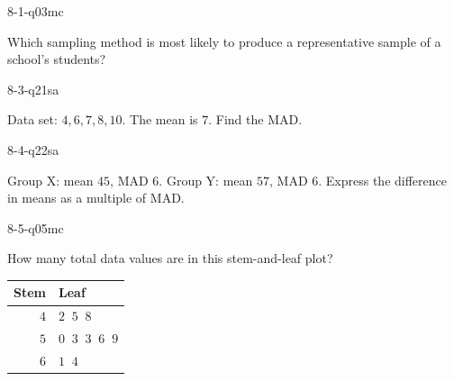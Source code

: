 \begin{practiceQuestion}{8-1-q03}{mc}
\begin{questionText}
Which sampling method is most likely to produce a representative sample of a school's students?
\end{questionText}
\end{practiceQuestion}

\begin{practiceQuestion}{8-3-q21}{sa}
\begin{questionText}
Data set: $4, 6, 7, 8, 10$. The mean is $7$. Find the MAD.
\end{questionText}
\end{practiceQuestion}

\begin{practiceQuestion}{8-4-q22}{sa}
\begin{questionText}
Group X: mean $45$, MAD $6$. Group Y: mean $57$, MAD $6$. Express the difference in means as a multiple of MAD.
\end{questionText}
\end{practiceQuestion}

\begin{practiceQuestion}{8-5-q05}{mc}
\begin{questionText}
How many total data values are in this stem-and-leaf plot?

\begin{center}
\begin{tabular}{r|l}
\textbf{Stem} & \textbf{Leaf} \\
\hline
$4$ & $2\;\;5\;\;8$ \\
$5$ & $0\;\;3\;\;3\;\;6\;\;9$ \\
$6$ & $1\;\;4$
\end{tabular}
\end{center}
\end{questionText}
\end{practiceQuestion}

